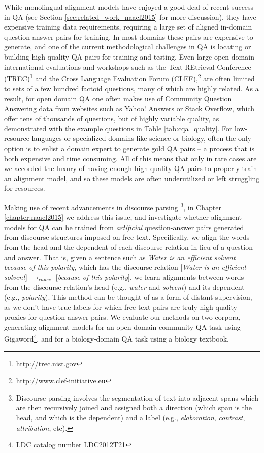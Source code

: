 While monolingual alignment models have enjoyed a good deal of recent success in QA (see Section \ref{sec:related_work_naacl2015} for more discussion), they have expensive training data requirements,  
requiring a large set of aligned in-domain question-answer pairs for training.
In most domains these pairs are expensive to generate, and one of the current methodological challenges in QA is locating or building high-quality QA pairs for training and testing. Even large open-domain international evaluations and workshops such as the Text REtrieval Conference (TREC)\footnote{\url{http://trec.nist.gov}} and the Cross Language Evaluation Forum (CLEF),\footnote{\url{http://www.clef-initiative.eu}} are often limited to sets of a few hundred factoid questions, many of which are highly related.  As a result, for open domain QA one often makes use of Community Question Answering data from websites such as Yahoo! Answers or Stack Overflow, which offer tens of thousands of questions, but of highly variable quality, as demonstrated with the example questions in Table \ref{tab:cqa_quality}.  
For low-resource languages or specialized domains like science or biology, often the only option is to enlist a domain expert to generate gold QA pairs --  a process that is both expensive and time consuming.  All of this means that only in rare cases are we accorded the luxury of having enough high-quality QA pairs to properly train an alignment model, and so these models are often underutilized or left struggling for resources. 

Making use of recent advancements in discourse parsing \citep{feng12}\footnote{Discourse parsing involves the segmentation of text into adjacent spans which are then recursively joined and assigned both a direction (which span is the head, and which is the dependent) and a label (e.g., \emph{elaboration}, \emph{contrast}, \emph{attribution}, etc).},  
in Chapter \ref{chapter:naacl2015} we address this issue, and investigate whether alignment models for QA can be trained from \emph{artificial} question-answer pairs generated from discourse structures  imposed on free text.  Specifically, we align the words from the head and the dependent of each discourse relation in lieu of a question and answer.  That is, given a sentence such as \textit{Water is an efficient solvent because of this polarity}, which has the discourse relation [\textit{Water is an efficient solvent}] $\rightarrow_{cause}$ [\textit{because of this polarity}], we learn alignments between words from the discourse relation's head (e.g., \textit{water} and \textit{solvent}) and its dependent (e.g., \textit{polarity}).
This method can be thought of as a form of distant supervision, as we don't have true labels for which free-text pairs are truly high-quality proxies for question-answer pairs.
We evaluate our methods on two corpora, generating alignment models for an open-domain community QA task using Gigaword\footnote{LDC catalog number LDC2012T21}, and for a biology-domain QA task using a biology textbook. 


